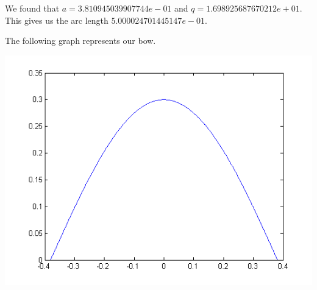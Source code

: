 We found that $a=3.810945039907744e-01$ and $q=1.698925687670212e+01$. This gives us the arc length $5.000024701445147e-01$. 

The following graph represents our bow.

\includegraphics[width=\textwidth]{bow.png}